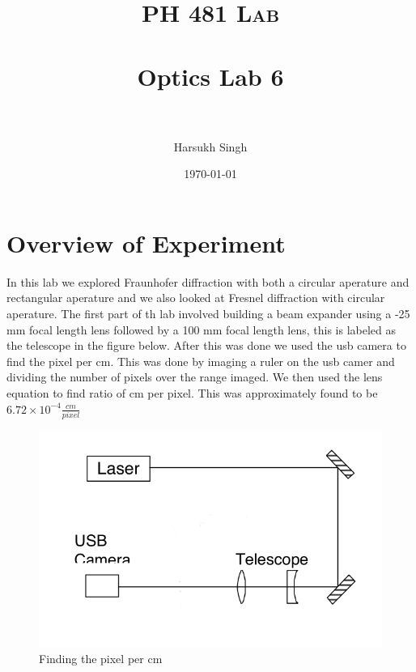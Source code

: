 \documentclass[paper=a4, fontsize=11pt]{scrartcl} %
\title{	
\normalfont \normalsize 
\textsc{PH 481 Lab} \\ [25pt] 
\horrule{2pt} \\[0.5cm] %
\huge Optics Lab 6\\ %
\horrule{2pt} \\[0.5cm] %
}
\author{Harsukh Singh} %
\date{\normalsize \today} %
\numberwithin{equation}{section}
\numberwithin{figure}{section}
\numberwithin{table}{section}
\begin{document}
\maketitle %
\section{Overview of Experiment}
In this lab we explored Fraunhofer diffraction with both a circular aperature 
and rectangular aperature and we also looked at Fresnel diffraction with circular aperature.  The first part of th lab 
involved building a beam expander using a -25 mm focal length lens followed by a 
100 mm focal length lens, this is labeled as the telescope in the figure below. After this was done we used the usb camera to find the pixel per cm. This was done by imaging a ruler on the usb camer and dividing the number of pixels over the range imaged. We then used the lens equation to find ratio of cm per pixel. This was approximately found to be $6.72 \times 10^{-4} \frac{cm}{pixel}$

\begin{figure}[H]
	\caption{Finding the pixel per cm}
		\begin{center}
			\includegraphics[scale=0.3]{stage}
		\end{center}
\end{figure}
\end{document}

